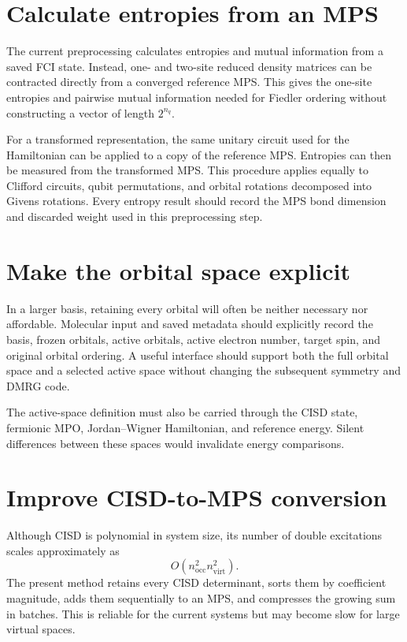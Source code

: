 \documentclass[11pt]{article}
\begin{document}
\section{Calculate entropies from an MPS}

The current preprocessing calculates entropies and mutual information from a
saved FCI state.  Instead, one- and two-site reduced density matrices can be
contracted directly from a converged reference MPS.  This gives the one-site
entropies and pairwise mutual information needed for Fiedler ordering without
constructing a vector of length $2^{n_q}$.

For a transformed representation, the same unitary circuit used for the
Hamiltonian can be applied to a copy of the reference MPS.  Entropies can then
be measured from the transformed MPS.  This procedure applies equally to
Clifford circuits, qubit permutations, and orbital rotations decomposed into
Givens rotations.  Every entropy result should record the MPS bond dimension
and discarded weight used in this preprocessing step.

\section{Make the orbital space explicit}

In a larger basis, retaining every orbital will often be neither necessary
nor affordable.  Molecular input and saved metadata should explicitly record
the basis, frozen orbitals, active orbitals, active electron number, target
spin, and original orbital ordering.  A useful interface should support both
the full orbital space and a selected active space without changing the
subsequent symmetry and DMRG code.

The active-space definition must also be carried through the CISD state,
fermionic MPO, Jordan--Wigner Hamiltonian, and reference energy.  Silent
differences between these spaces would invalidate energy comparisons.

\section{Improve CISD-to-MPS conversion}

Although CISD is polynomial in system size, its number of double excitations
scales approximately as
\begin{equation}
  O\!\left(n_{\mathrm{occ}}^2 n_{\mathrm{virt}}^2\right).
\end{equation}
The present method retains every CISD determinant, sorts them by coefficient
magnitude, adds them sequentially to an MPS, and compresses the growing sum in
batches.  This is reliable for the current systems but may become slow for
large virtual spaces.
\end{document}

